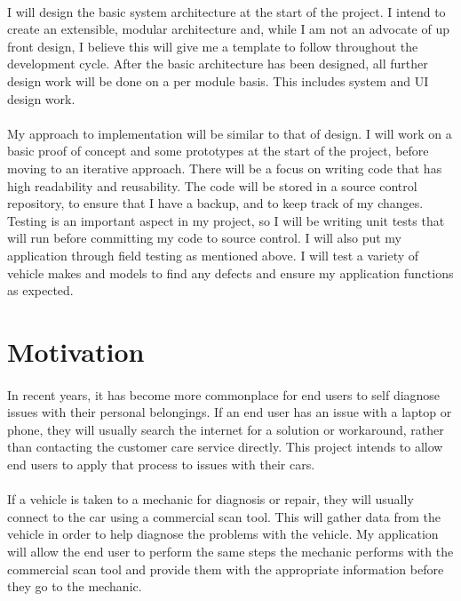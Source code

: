 \documentclass[12pt]{report}
\begin{document}
			\paragraph{}
			{
			I will design the basic system architecture at the start of the project. I intend to create an extensible, modular architecture and, while I am not an advocate of up front design, I believe this will give me a template to follow throughout the development cycle. After the basic architecture has been designed, all further design work will be done on a per module basis. This includes system and UI design work.
			}
			\paragraph{}
			{
 			My approach to implementation will be similar to that of design. I will work on a basic proof of concept and some prototypes at the start of the project, before moving to an iterative approach. There will be a focus on writing code that has high readability and reusability. The code will be stored in a source control repository, to ensure that I have a backup, and to keep track of my changes. Testing is an important aspect in my project, so I will be writing unit tests that will run before committing my code to source control. I will also put my application through field testing as mentioned above. I will test a variety of vehicle makes and models to find any defects and ensure my application functions as expected. 
			}
		\section{Motivation}
		\paragraph{}{
		In recent years, it has become more commonplace for end users to self diagnose issues with their personal belongings. If an end user has an issue with a laptop or phone, they will usually search the internet for a solution or workaround, rather than contacting the customer care service directly. This project intends to allow end users to apply that process to issues with their cars.
		}
		\paragraph{}{
		If a vehicle is taken to a mechanic for diagnosis or repair, they will usually connect to the car using a commercial scan tool. This will gather data from the vehicle in order to help diagnose the problems with the vehicle. My application will allow the end user to perform the same steps the mechanic performs with the commercial scan tool and provide them with the appropriate information before they go to the mechanic.
		}
\end{document}
